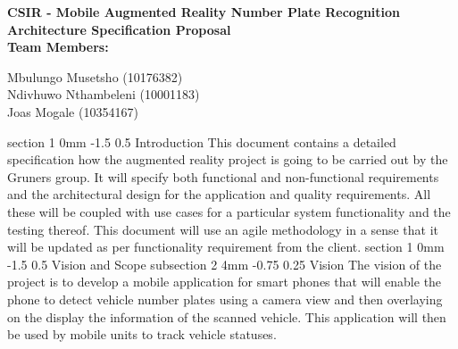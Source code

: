 \documentclass[12pt]{article}
\makeatletter
\newcommand{\Title}{CSIR - Mobile Augmented Reality Number Plate Recognition} %
\renewcommand{\section}{\@startsection
   {section}%
   {1}%
   {0mm}%
   {-1.5\baselineskip}%
   {0.5\baselineskip}%
   {\sffamily\bfseries\upshape\normalsize}}%
\renewcommand{\subsection}{\@startsection
   {subsection}%
   {2}%
   {4mm}%
   {-0.75\baselineskip}%
   {0.25\baselineskip}%
   {\rmfamily\normalfont\scshape\normalsize}}%
\makeatother
\begin{document}
        \vspace{4em}
        
        \begin{center}%
        
          \LARGE \bf \Title \\[4em]
          \LARGE {\bf Architecture Specification Proposal}\\[1em]
          \LARGE {\bf Team Members:}\\[2em]
          \large
          
             Mbulungo Musetsho                          (10176382) \\[1em]
             Ndivhuwo Nthambeleni (10001183)	\\[1em]
             Joas Mogale (10354167)		\\[1em]
            
        \end{center}%
        

        \newpage
        \tableofcontents    
                \newpage
                \section{Introduction}
                		This document contains a detailed specification how the augmented reality project is going to be carried out by the Gruners group. It will specify both functional and non-functional requirements and the architectural design for the application and quality requirements. All these will be coupled with use cases for a particular system functionality and the testing thereof. This document will use an agile methodology in a sense that it will be updated as per functionality requirement from the client. 
                \section{Vision and Scope}
                		\subsection{Vision}
                				The vision of the project is to develop a mobile application for smart phones that will enable the phone to detect vehicle number plates using a camera view and then overlaying on the display the information of the scanned vehicle. This application will then be used by mobile units to track vehicle statuses. 
\end{document}
